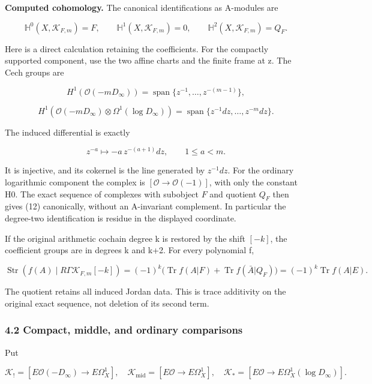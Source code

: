 \documentclass[
  11pt,
]{article}
\begin{document}
\textbf{Computed cohomology.} The canonical identifications as A-modules
are

\[
\boxed{\mathbb H^0(X,\mathcal K_{F,m})=F,\qquad
\mathbb H^1(X,\mathcal K_{F,m})=0,\qquad
\mathbb H^2(X,\mathcal K_{F,m})=Q_F.}
\tag{12}
\]

Here is a direct calculation retaining the coefficients. For the
compactly supported component, use the two affine charts and the finite
frame at z. The Cech groups are

\[
H^1(\mathcal O(-mD_\infty))
=\operatorname{span}\{z^{-1},\ldots,z^{-(m-1)}\},
\]

\[
H^1(\mathcal O(-mD_\infty)\otimes\Omega^1(\log D_\infty))
=\operatorname{span}\{z^{-1}dz,\ldots,z^{-m}dz\}.
\]

The induced differential is exactly

\[
 z^{-a}\longmapsto-a\,z^{-(a+1)}dz,\qquad 1\le a<m.
\tag{13}
\]

It is injective, and its cokernel is the line generated by \(z^{-1}dz\).
For the ordinary logarithmic component the complex is
\([\mathcal O\to\mathcal O(-1)]\), with only the constant H0. The exact
sequence of complexes with subobject \(F\) and quotient \(Q_F\) then
gives (12) canonically, without an A-invariant complement. In particular
the degree-two identification is residue in the displayed coordinate.

If the original arithmetic cochain degree k is restored by the shift
\([-k]\), the coefficient groups are in degrees k and k+2. For every
polynomial f,

\[
\boxed{\operatorname{Str}(f(A)\mid R\Gamma\mathcal K_{F,m}[-k])
=(-1)^k\bigl(\operatorname{Tr}f(A|F)+\operatorname{Tr}f(\bar A|Q_F)\bigr)
=(-1)^k\operatorname{Tr}f(A|E).}
\tag{14}
\]

The quotient retains all induced Jordan data. This is trace additivity
on the original exact sequence, not deletion of its second term.

\subsubsection{4.2 Compact, middle, and ordinary
comparisons}\label{compact-middle-and-ordinary-comparisons}

Put

\[
\mathcal K_!=[E\mathcal O(-D_\infty)\to E\Omega_X^1],\quad
\mathcal K_{\mathrm{mid}}=[E\mathcal O\to E\Omega_X^1],\quad
\mathcal K_*=[E\mathcal O\to E\Omega_X^1(\log D_\infty)].
\tag{15}
\]
\end{document}
